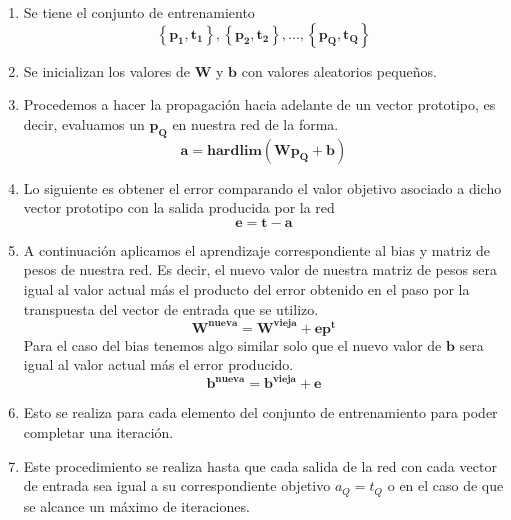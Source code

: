         \begin{enumerate}
            \item Se tiene el conjunto de entrenamiento
            \[ \left\lbrace \boldsymbol{p_1, t_1}\right\rbrace , \left\lbrace \boldsymbol{p_2, t_2}\right\rbrace , ... , \left\lbrace \boldsymbol{p_Q, t_Q}\right\rbrace\]
            \item Se inicializan los valores de $\boldsymbol{W}$ y $\boldsymbol{b}$ con valores aleatorios pequeños.
            \item Procedemos a hacer la propagación hacia adelante de un vector prototipo, es decir, evaluamos un $\boldsymbol{p_Q}$ en nuestra red de la forma.
            \[ \boldsymbol{a = hardlim(Wp_Q+b)} \]
            \item Lo siguiente es obtener el error comparando el valor objetivo asociado a dicho vector prototipo con la salida producida por la red
            \[ \boldsymbol{e=t-a} \]
            \item A continuación aplicamos el aprendizaje correspondiente al bias y matriz de pesos de nuestra red. Es decir, el nuevo valor de nuestra matriz de pesos sera igual al valor actual más el producto del error obtenido en el paso por la transpuesta del vector de entrada que se utilizo.
            \[ \boldsymbol{W^{nueva} = W^{vieja} + ep^{t}} \]
            Para el caso del bias tenemos algo similar solo que el nuevo valor de $\boldsymbol{b}$ sera igual al valor actual más el error producido.
            \[ \boldsymbol{b^{nueva} = b^{vieja} + e} \]
            \item Esto se realiza para cada elemento del conjunto de entrenamiento para poder completar una iteración.
            \item Este procedimiento se realiza hasta que cada salida de la red con cada vector de entrada sea igual a su correspondiente objetivo $a_Q = t_Q$ o en el caso de que se alcance un máximo de iteraciones.
        \end{enumerate}
        \newpage
